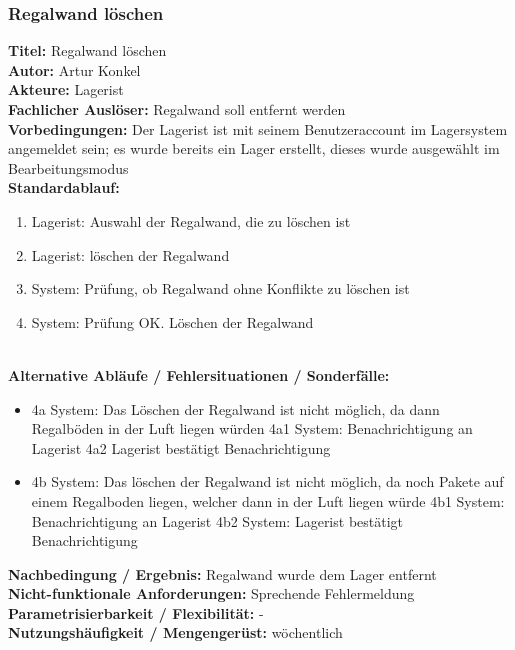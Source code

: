 \subsubsection{Regalwand löschen}
\textbf{Titel:} Regalwand löschen\\
\textbf{Autor:} Artur Konkel\\
\textbf{Akteure:} Lagerist\\
\textbf{Fachlicher Auslöser:} Regalwand soll entfernt werden\\
\textbf{Vorbedingungen:} Der Lagerist ist mit seinem Benutzeraccount im Lagersystem angemeldet sein; es wurde bereits ein Lager erstellt, dieses wurde ausgewählt im Bearbeitungsmodus\\
\textbf{Standardablauf:}
\begin{enumerate}
	\item Lagerist: Auswahl der Regalwand, die zu löschen ist
	\item Lagerist: löschen der Regalwand
	\item System: Prüfung, ob Regalwand ohne Konflikte zu löschen ist
	\item System: Prüfung OK. Löschen der Regalwand
\end{enumerate}\\
\textbf{Alternative Abläufe / Fehlersituationen / Sonderfälle:}
\begin{itemize}
	\item 4a System: Das Löschen der Regalwand ist nicht möglich, da dann Regalböden in der Luft liegen würden
	\subitem 4a1 System: Benachrichtigung an Lagerist
	\subitem 4a2 Lagerist bestätigt Benachrichtigung
	\item 4b System: Das löschen der Regalwand ist nicht möglich, da noch Pakete auf einem Regalboden liegen,
	welcher dann in der Luft liegen würde
	\subitem 4b1 System: Benachrichtigung an Lagerist
	\subitem 4b2 System: Lagerist bestätigt Benachrichtigung

\end{itemize}
\textbf{Nachbedingung / Ergebnis:} Regalwand wurde dem Lager entfernt\\
\textbf{Nicht-funktionale Anforderungen:} Sprechende Fehlermeldung\\
\textbf{Parametrisierbarkeit / Flexibilität:} - \\
\textbf{Nutzungshäufigkeit / Mengengerüst:} wöchentlich\\

